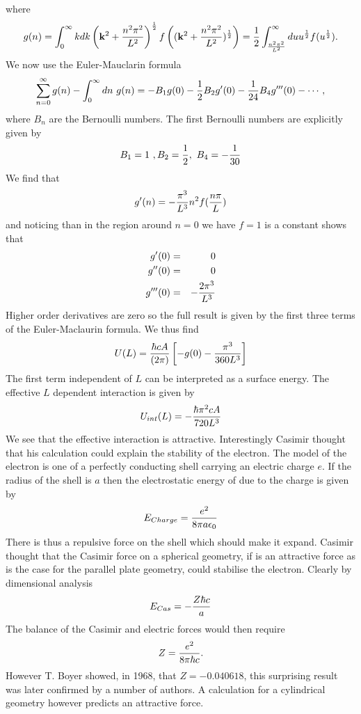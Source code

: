 where
\begin{equation}
    g(n) = \int_0^\infty   kdk \left({\bf k}^2 + {n^2\pi^2\over L^2}\right)^{1\over 2} f\left(({\bf k}^2 + {n^2\pi^2\over L^2})^{1\over 2}\right) = {1\over 2}\int_{n^2\pi^2\over L^2}^\infty du u^{1\over 2} f(u^{1\over 2}).
\end{equation}
We now use the Euler-Mauclarin formula
\begin{equation}
    \sum_{n=0}^\infty g(n) -\int_0^\infty dn \ g(n) = -B_1g(0) -{1\over 2} B_2 g'(0) - {1\over 24} B_4 g'''(0) - \cdots,
\end{equation}
where $B_n$ are the Bernoulli numbers. The first Bernoulli numbers are explicitly given by
\begin{equation}
    B_1 =1\ , B_2 = {1\over 2} ,\ B_4 = -{1\over 30}
\end{equation}
We find that
\begin{equation}
    g'(n) = -{\pi^3\over L^3} n^2 f({n\pi\over L})
\end{equation}
and noticing than in the region around $n=0$ we have $f=1$ is a constant shows that
\begin{eqnarray}
g'(0) &=& 0 \\
g''(0) &=& 0 \\
g'''(0) &=& -{2\pi^3\over L^3}
\end{eqnarray}
Higher order derivatives are zero so the full result is given by the first three terms of the Euler-Maclaurin formula. We thus find
\begin{equation}
    U(L) = {\hbar c A\over (2\pi)}\left[ -g(0) -{\pi^3\over 360 L^3}\right]
\end{equation}
The first term independent of $L$ can be interpreted as a surface energy. The effective $L$ dependent interaction is given by
\begin{equation}
    U_{int}(L) = -{\hbar \pi^2 c A\over 720 L^3}
\end{equation}
We see that the effective interaction is attractive. Interestingly Casimir thought that his calculation could explain the stability of the electron. The model of the electron is one of a perfectly conducting shell carrying an electric charge $e$. If the radius of the shell is $a$ then the electrostatic energy of due to the charge is given by
\begin{equation}
    E_{Charge} = {e^2\over 8\pi a\epsilon_0}
\end{equation}
There is thus a repulsive force on the shell which should make it expand. Casimir thought that the Casimir force on a spherical geometry,   
if is an attractive force as is the case for the parallel plate geometry, could stabilise the electron. Clearly by dimensional analysis
\begin{equation}
    E_{Cas} = -{Z\hbar c\over a}
\end{equation}
The balance of the Casimir and electric forces would then require
\begin{equation}
    Z = {e^2\over 8\pi \hbar c}.
\end{equation}
However T. Boyer showed, in 1968, that $Z = -0.040618$, this surprising result was later confirmed by a number of authors. A calculation for a cylindrical geometry however predicts
an attractive force. 

